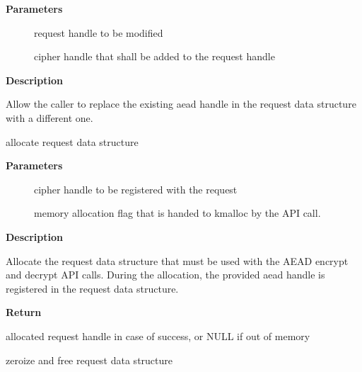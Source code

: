 \documentclass[a4paper,8pt,english]{sphinxmanual}
\begin{document}
\textbf{Parameters}
\begin{description}
\item[{}] \leavevmode
request handle to be modified

\item[{}] \leavevmode
cipher handle that shall be added to the request handle

\end{description}

\textbf{Description}

Allow the caller to replace the existing aead handle in the request
data structure with a different one.

\begin{fulllineitems}
\label{crypto/api-aead:c.aead_request_alloc}
allocate request data structure

\end{fulllineitems}


\textbf{Parameters}
\begin{description}
\item[{}] \leavevmode
cipher handle to be registered with the request

\item[{}] \leavevmode
memory allocation flag that is handed to kmalloc by the API call.

\end{description}

\textbf{Description}

Allocate the request data structure that must be used with the AEAD
encrypt and decrypt API calls. During the allocation, the provided aead
handle is registered in the request data structure.

\textbf{Return}

allocated request handle in case of success, or NULL if out of memory

\begin{fulllineitems}
\label{crypto/api-aead:c.aead_request_free}
zeroize and free request data structure

\end{fulllineitems}
\end{document}
